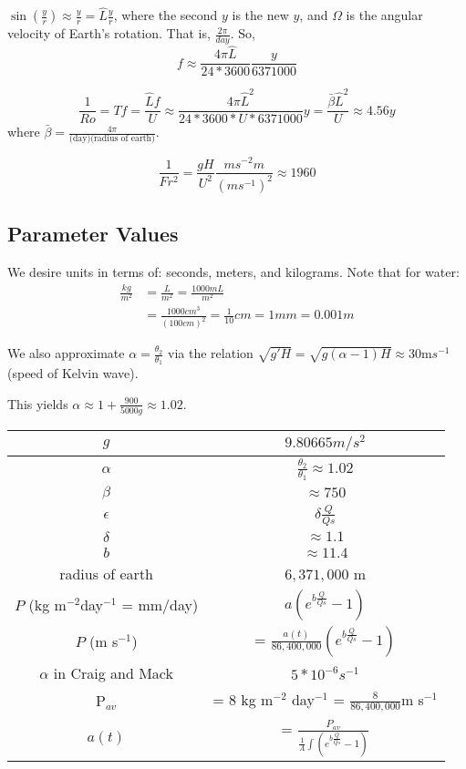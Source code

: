 \documentclass[10pt]{article}
\begin{document}
$\sin(\frac{y}{r})\approx \frac{y}{r} = \hat{L} \frac{y}{r}$, where the second $y$ is the new $y$, and $\Omega$ is the angular velocity of Earth's rotation. That is, $\frac{2\pi}{day}$. So, 
\begin{equation*}
f \approx \frac{4\pi\hat{L}}{24*3600}\frac{y}{6371000}
\end{equation*}

\begin{equation*}
\frac{1}{Ro} = Tf = \frac{\hat{L}f}{U} \approx \frac{4\pi \hat{L}^2}{24*3600*U*6371000} y =\frac{\bar{\beta}\hat{L}^2}{U} \approx 4.56 y
\end{equation*}
 where $\bar{\beta} = \frac{4\pi}{\text{(day)(radius of earth)}}$.

\begin{equation}
\frac{1}{Fr^2} = \frac{gH}{U^2} \frac{ms^{-2}m}{(ms^{-1})^2} \approx 1960
\end{equation}

\subsection{Parameter Values}



We desire units in terms of: seconds, meters, and kilograms. Note that for water:
\begin{align*}
\frac{kg}{m^2} &= \frac{L}{m^2} = \frac{1000 mL}{m^2}\\
&= \frac{1000 cm^3}{ (100cm)^2} = \frac{1}{10} cm = 1 mm = 0.001 m 
\end{align*}

We also approximate $\alpha = \frac{\theta_2}{\theta_1}$ via the relation $\sqrt{g'H} = \sqrt{g(\alpha -1) H} \approx 30 $m$s^{-1}$ (speed of Kelvin wave).

This yields $\alpha \approx 1+\frac{900}{5000g} \approx 1.02$.


\begin{center}
	\begin{tabular}{ |c|c| } 
		\hline
		$g$  & $9.80665 m/s^2$ \\  \hline
		$\alpha$  & $\frac{\theta_2}{\theta_1}\approx 1.02$ \\ \hline
		$\beta$ &  $\approx 750$ \\ \hline
		$\epsilon$ &   $\delta \frac{Q}{Qs}$ \\ \hline
		$\delta$ & $ \approx 1.1$  \\ \hline
		$b$& $ \approx 11.4$\\ \hline
		radius of earth & $6,371,000$ m \\ \hline
		$P$ (kg m$^{-2}$day$^{-1}$ = mm/day)& $a(e^{b\frac{Q}{Qs}}-1)$ \\ 
		$P$ (m s$^{-1}$) &=  $\frac{a(t)}{86,400,000}(e^{b\frac{Q}{Qs}}-1)$\\
		$\alpha$ in Craig and Mack & $5 * 10^{-6} s^{-1}$ \\ \hline
		P$_{av}$ &= $8$ kg m$^{-2}$ day$^{-1}$ = $\frac{8}{86,400,000}$m s$^{-1}$ \\ \hline
		$a(t)$  &= $\frac{P_{av}}{\frac{1}{A}\int (e^{b\frac{Q}{Qs}}-1)}$ \\ \hline
	\end{tabular}
\end{center}
\end{document}
